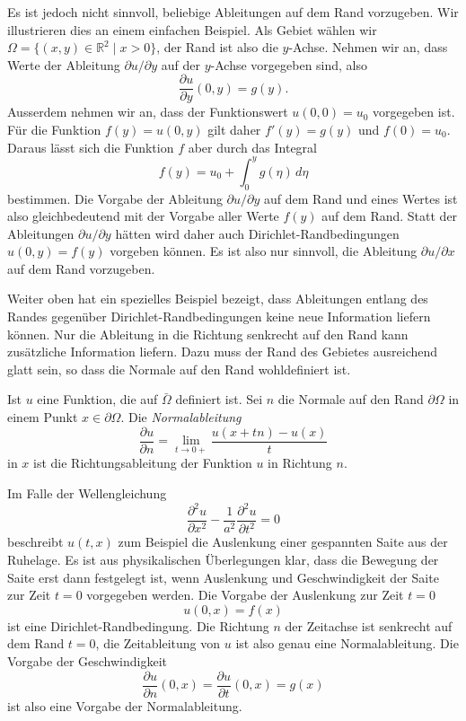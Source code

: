 Es ist jedoch nicht sinnvoll, beliebige Ableitungen auf dem Rand
vorzugeben.
Wir illustrieren dies an einem einfachen Beispiel.
Als Gebiet wählen wir $\Omega = \{(x,y)\in\mathbb R^2\;|\; x > 0\}$,
der Rand ist also die $y$-Achse.
Nehmen wir an, dass Werte der Ableitung $\partial u/\partial y$ 
auf der $y$-Achse vorgegeben sind, also
\[
\frac{\partial u}{\partial y}(0,y)  = g(y).
\]
Ausserdem nehmen wir an, dass der Funktionswert $u(0,0)=u_0$ vorgegeben ist.
Für die Funktion $f(y) = u(0,y)$ gilt daher $f'(y) = g(y)$ und $f(0)=u_0$.
Daraus lässt sich die Funktion $f$ aber durch das Integral
\[
f(y) = u_0 + \int_0^y g(\eta)\,d\eta
\]
bestimmen.
Die Vorgabe der Ableitung $\partial u/\partial y$ auf dem Rand und eines
Wertes ist also gleichbedeutend mit der Vorgabe aller Werte $f(y)$ auf dem
Rand.
Statt der Ableitungen $\partial u/\partial y$ hätten wird daher auch
Dirichlet-Randbedingungen $u(0,y) = f(y)$ vorgeben können.
Es ist also nur sinnvoll, die Ableitung $\partial u/\partial x$ 
auf dem Rand vorzugeben.

Weiter oben hat ein spezielles Beispiel bezeigt,
dass Ableitungen entlang des Randes gegenüber Dirichlet-Randbedingungen
keine neue Information liefern können.
Nur die Ableitung in die Richtung senkrecht auf den Rand kann zusätzliche
Information liefern.
Dazu muss der Rand des Gebietes ausreichend glatt sein, so dass die
Normale auf den Rand wohldefiniert ist.

\begin{definition}
Ist $u$ eine Funktion, die auf $\bar\Omega$ definiert ist.
Sei $n$ die Normale auf den Rand $\partial\Omega$ in einem Punkt
$x\in\partial\Omega$.
Die {\em Normalableitung}
\[
\frac{\partial u}{\partial n}
=
\lim_{t\to 0+} \frac{u(x+tn)-u(x)}{t}
\]
in $x$ ist die Richtungsableitung 
der Funktion $u$ in Richtung $n$.
\end{definition}
%

Im Falle der Wellengleichung
\[
\frac{\partial^2 u}{\partial x^2}
-
\frac{1}{a^2}
\frac{\partial^2 u}{\partial t^2}
=0
\]
beschreibt $u(t,x)$ zum Beispiel die Auslenkung einer gespannten Saite
aus der Ruhelage.
Es ist aus physikalischen Überlegungen klar, dass die Bewegung der Saite
erst dann festgelegt ist, wenn Auslenkung und Geschwindigkeit der Saite
zur Zeit $t=0$ vorgegeben werden.
Die Vorgabe der Auslenkung zur Zeit $t=0$
\[
u(0,x) = f(x)
\]
ist eine Dirichlet-Randbedingung.
Die Richtung $n$ der Zeitachse ist senkrecht auf dem Rand $t=0$,
die Zeitableitung von $u$ ist also genau eine Normalableitung.
Die Vorgabe der Geschwindigkeit
\[
\frac{\partial u}{\partial n}(0,x)
=
\frac{\partial u}{\partial t}(0,x)
=
g(x)
\]
ist also eine Vorgabe der Normalableitung.

